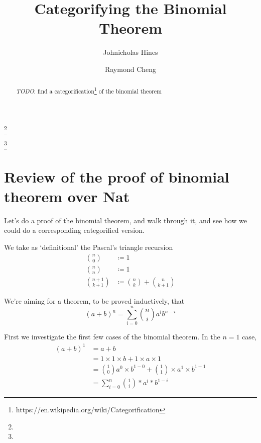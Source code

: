 \documentclass{proc-l}
\theoremstyle{definition}
\theoremstyle{remark}
\numberwithin{equation}{section}
\begin{document}
\title[Categorifying the Binomial Theorem]{Categorifying the Binomial Theorem}


\author{Johnicholas Hines}
\address{}
\curraddr{}
\email{}
\thanks{}

\author{Raymond Cheng}
\address{}
\curraddr{}
\email{}
\thanks{}


\date{}

\dedicatory{}

\commby{}

\begin{abstract}
\emph{TODO}: find a categorification\footnote{https://en.wikipedia.org/wiki/Categorification} of the binomial theorem
\end{abstract}

\maketitle

\section{Review of the proof of binomial theorem over Nat}

Let's do a proof of the binomial theorem, and walk through it,
and see how we could do a corresponding categorified version.

We take as `definitional' the Pascal's triangle recursion
\begin{align*}
{n \choose 0} & \coloneqq 1 \\
{n \choose n} & \coloneqq 1 \\
{n + 1 \choose k + 1} & \coloneqq {n \choose k} + {n \choose k+1}
\end{align*}

We're aiming for a theorem, to be proved inductively, that
\[
(a + b)^n = \sum_{i=0}^n {n \choose i} a^i b^{n-i}
\]

First we investigate the first few cases of the binomial theorem. In the \(n = 1\) case,
\begin{align*}
(a + b)^1 & = a + b \\ %
& = 1 \times 1 \times b + 1 \times a \times 1 \\ %
& = {1 \choose 0} a^0 \times b^{1-0} + {1 \choose 1} \times a^1 \times b^{1-1} \\ %
& = \sum_{i=0}^n {1 \choose i} * a^i * b^{1-i} %
\end{align*}
\end{document}
